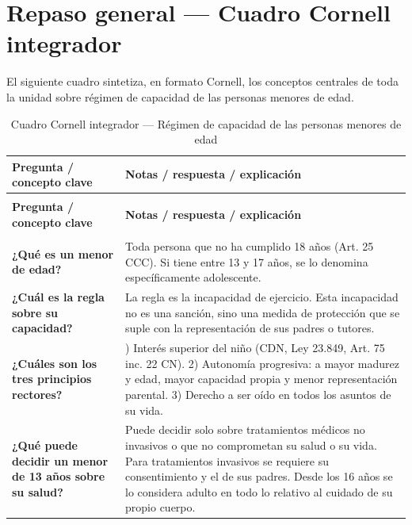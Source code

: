 \documentclass[12pt,oneside]{book}
\begin{document}
\chapter{Repaso general — Cuadro Cornell integrador}

El siguiente cuadro sintetiza, en formato Cornell, los conceptos centrales de toda la unidad sobre régimen de capacidad de las personas menores de edad.

\begin{longtable}{
    >{\raggedright\arraybackslash}p{}
    >{\raggedright\arraybackslash}p{}
}
\caption{Cuadro Cornell integrador — Régimen de capacidad de las personas menores de edad} \\
\toprule
\textbf{Pregunta / concepto clave} & \textbf{Notas / respuesta / explicación} \\
\midrule
\endfirsthead

\multicolumn{2}{c}{\textit{(continuación)}} \\
\toprule
\textbf{Pregunta / concepto clave} & \textbf{Notas / respuesta / explicación} \\
\midrule
\endhead

\midrule
\multicolumn{2}{r}{\textit{continúa en la página siguiente}} \\
\endfoot

\bottomrule
\endlastfoot

\textbf{¿Qué es un menor de edad?} &
Toda persona que no ha cumplido 18 años (Art. 25 CCC). Si tiene entre 13 y 17 años, se lo denomina específicamente adolescente. \\

\textbf{¿Cuál es la regla sobre su capacidad?} &
La regla es la incapacidad de ejercicio. Esta incapacidad no es una sanción, sino una medida de protección que se suple con la representación de sus padres o tutores. \\

\textbf{¿Cuáles son los tres principios rectores?} &
1) Interés superior del niño (CDN, Ley 23.849, Art. 75 inc. 22 CN). 2) Autonomía progresiva: a mayor madurez y edad, mayor capacidad propia y menor representación parental. 3) Derecho a ser oído en todos los asuntos de su vida. \\

\textbf{¿Qué puede decidir un menor de 13 años sobre su salud?} &
Puede decidir solo sobre tratamientos médicos no invasivos o que no comprometan su salud o su vida. Para tratamientos invasivos se requiere su consentimiento y el de sus padres. Desde los 16 años se lo considera adulto en todo lo relativo al cuidado de su propio cuerpo. \\


\end{longtable}
\end{document}
